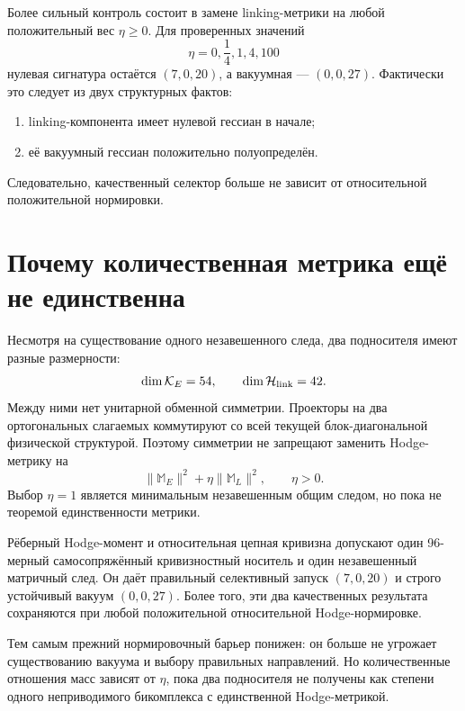 Более сильный контроль состоит в замене linking-метрики на любой
положительный вес $\eta\ge0$. Для проверенных значений
\begin{equation}
 \eta=0,\frac14,1,4,100
 \label{eq:v7-common-positive-weight-scan}
\end{equation}
нулевая сигнатура остаётся $(7,0,20)$, а вакуумная --- $(0,0,27)$.
Фактически это следует из двух структурных фактов:
\begin{enumerate}
 \item linking-компонента имеет нулевой гессиан в начале;
 \item её вакуумный гессиан положительно полуопределён.
\end{enumerate}
Следовательно, качественный селектор больше не зависит от относительной
положительной нормировки.

\section{Почему количественная метрика ещё не единственна}

Несмотря на существование одного незавешенного следа, два подносителя имеют
разные размерности:
\begin{equation}
 \dim\mathcal K_E=54,\qquad
 \dim\mathcal H_{\rm link}=42.
 \label{eq:v7-common-dimension-mismatch}
\end{equation}
Между ними нет унитарной обменной симметрии. Проекторы на два ортогональных
слагаемых коммутируют со всей текущей блок-диагональной физической
структурой. Поэтому симметрии не запрещают заменить Hodge-метрику на
\begin{equation}
 \|\mathbb M_E\|^2+\eta\|\mathbb M_L\|^2,
 \qquad \eta>0.
 \label{eq:v7-common-metric-family}
\end{equation}
Выбор $\eta=1$ является минимальным незавешенным общим следом, но пока не
теоремой единственности метрики.

\begin{theorem}
Рёберный Hodge-момент и относительная цепная кривизна допускают один
96-мерный самосопряжённый кривизностный носитель и один незавешенный
матричный след. Он даёт правильный селективный запуск $(7,0,20)$ и строго
устойчивый вакуум $(0,0,27)$. Более того, эти два качественных результата
сохраняются при любой положительной относительной Hodge-нормировке.
\end{theorem}

\begin{remark}
Тем самым прежний нормировочный барьер понижен: он больше не угрожает
существованию вакуума и выбору правильных направлений. Но количественные
отношения масс зависят от $\eta$, пока два подносителя не получены как
степени одного неприводимого бикомплекса с единственной Hodge-метрикой.
\end{remark}

